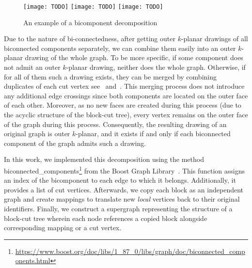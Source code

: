 \begin{figure}[tbh]
    \centering
     {
        \texttt{[image: TODO]}
    }
    \hfill
     {
        \texttt{[image: TODO]}
    }
    \hfill
    \hfill
     {
        \texttt{[image: TODO]}
    }
    \caption{An example of a bicomponent decomposition}
\end{figure}

Due to the nature of bi-connectedness, after getting outer \(k\)-planar drawings of all biconnected components separately, we can combine them easily into an outer \(k\)-planar drawing of the whole graph. To be more specific, if some component does not admit an outer \(k\)-planar drawing, neither does the whole graph. Otherwise, if for all of them such a drawing exists, they can be merged by combining duplicates of each cut vertex see~ and~. This merging process does not introduce any additional edge crossings since both components are located on the outer face of each other. Moreover, as no new faces are created during this process (due to the acyclic structure of the block-cut tree), every vertex remains on the outer face of the graph during this process. Consequently, the resulting drawing of an original graph is outer \(k\)-planar, and it exists if and only if each biconnected component of the graph admits such a drawing.

In this work, we implemented this decomposition using the method \textsf{bi\-connec\-ted\_compo\-nents}\footnote{\url{https://www.boost.org/doc/libs/1_87_0/libs/graph/doc/biconnected_components.html}} from the Boost Graph Library~\cite{boost}. This function assigns an index of the bicomponent to each edge to which it belongs. Additionally, it provides a list of cut vertices. Afterwards, we copy each block as an independent graph and create mappings to translate new \emph{local} vertices back to their original identifiers. Finally, we construct a supergraph representing the structure of a block-cut tree wherein each node references a copied block alongside corresponding mapping or a cut vertex.

